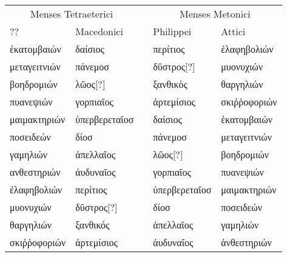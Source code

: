 \begin{tabular}{@{}l l c ll@{}}
\toprule
 \multicolumn{2}{c}{Menses Tetraeterici} & &
 \multicolumn{2}{c}{Menses Metonici} \\
\cmidrule{1-2}\cmidrule{4-5}
 ?? & Macedonici & & Philippei & Attici \\
\midrule[\heavyrulewidth]
 \textgreek{ἑκατομβαιών} &
 \textgreek{δαίσιος} & &
 \textgreek{περίτιος} &
 \textgreek{ἐλαφηβολιών}
\\
 \textgreek{μεταγειτνιών} &
 \textgreek{πάνεμοσ} & &
 \textgreek{δῦστρος[?]} &
 \textgreek{μυονυχιών}
\\
 \textgreek{βοηδρομιών} &
 \textgreek{λῶος[?]} & & %
 \textgreek{ξανθικὸς} &
 \textgreek{θαργηλιών}
\\
\midrule
 \textgreek{πυανεψιών} &
 \textgreek{γορπιαῖος} & &
 \textgreek{ἀρτεμίσιος} &
 \textgreek{σκιῤῥοφοριών}
\\
 \textgreek{μαιμακτηριών} &
 \textgreek{ὑπερβερεταῖοσ} & &
 \textgreek{δαίσιος} &
 \textgreek{ἑκατομβαιών}
\\
 \textgreek{ποσειδεών} &
 \textgreek{δίοσ} & &
 \textgreek{πάνεμοσ} &
 \textgreek{μεταγειτνιών}
\\
\midrule
 \textgreek{γαμηλιών} &
 \textgreek{ἀπελλαῖος} & &
 \textgreek{λῶος[?]} &
 \textgreek{βοηδρομιών}
\\
 \textgreek{ανθεστηριών} &
 \textgreek{ἀυδυναῖος} & &
 \textgreek{γορπιαῖος} &
 \textgreek{πυανεψιών}
\\
 \textgreek{ἐλαφηβολιών} &
 \textgreek{περίτιος} & &
 \textgreek{ὑπερβερεταῖοσ} &
 \textgreek{μαιμακτηριών}
\\
\midrule
 \textgreek{μυονυχιών} &
 \textgreek{δῦστρος[?]} & & %
 \textgreek{δίοσ} &
 \textgreek{ποσειδεών}
\\
 \textgreek{θαργηλιών} &
 \textgreek{ξανθικός} & &
 \textgreek{ἀπελλαῖος} &
 \textgreek{γαμηλιών}
\\
 \textgreek{σκιῤῥοφοριών} &
 \textgreek{ἀρτεμίσιος} & &
 \textgreek{ἀυδυναῖος} &
 \textgreek{ἀνθεστηριών}
\\
\bottomrule
\end{tabular}
%
